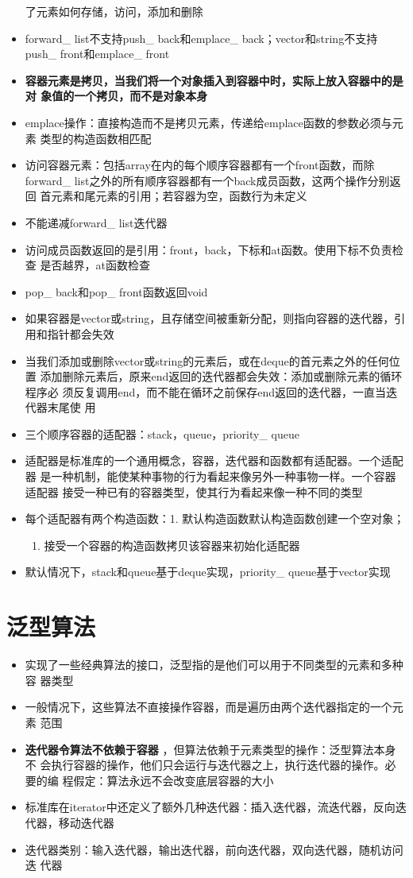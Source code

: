 \documentclass[11pt]{article}
\begin{document}
\begin{itemize}
了元素如何存储，访问，添加和删除
\item forward\_ list不支持push\_ back和emplace\_ back；vector和string不支持
push\_ front和emplace\_ front
\item \textbf{容器元素是拷贝，当我们将一个对象插入到容器中时，实际上放入容器中的是对
象值的一个拷贝，而不是对象本身}
\item emplace操作：直接构造而不是拷贝元素，传递给emplace函数的参数必须与元素
类型的构造函数相匹配
\item 访问容器元素：包括array在内的每个顺序容器都有一个front函数，而除
forward\_ list之外的所有顺序容器都有一个back成员函数，这两个操作分别返回
首元素和尾元素的引用；若容器为空，函数行为未定义
\item 不能递减forward\_ list迭代器
\item 访问成员函数返回的是引用：front，back，下标和at函数。使用下标不负责检查
是否越界，at函数检查
\item pop\_ back和pop\_ front函数返回void
\item 如果容器是vector或string，且存储空间被重新分配，则指向容器的迭代器，引
用和指针都会失效
\item 当我们添加或删除vector或string的元素后，或在deque的首元素之外的任何位置
添加删除元素后，原来end返回的迭代器都会失效：添加或删除元素的循环程序必
须反复调用end，而不能在循环之前保存end返回的迭代器，一直当迭代器末尾使
用
\item 三个顺序容器的适配器：stack，queue，priority\_ queue
\item 适配器是标准库的一个通用概念，容器，迭代器和函数都有适配器。一个适配器
是一种机制，能使某种事物的行为看起来像另外一种事物一样。一个容器适配器
接受一种已有的容器类型，使其行为看起来像一种不同的类型
\item 每个适配器有两个构造函数：1. 默认构造函数默认构造函数创建一个空对象；
\begin{enumerate}
\item 接受一个容器的构造函数拷贝该容器来初始化适配器
\end{enumerate}
\item 默认情况下，stack和queue基于deque实现，priority\_ queue基于vector实现
\end{itemize}
\section{泛型算法}
\label{sec-7}
\begin{itemize}
\item 实现了一些经典算法的接口，泛型指的是他们可以用于不同类型的元素和多种容
器类型
\item 一般情况下，这些算法不直接操作容器，而是遍历由两个迭代器指定的一个元素
范围
\item \textbf{迭代器令算法不依赖于容器} ，但算法依赖于元素类型的操作：泛型算法本身不
会执行容器的操作，他们只会运行与迭代器之上，执行迭代器的操作。必要的编
程假定：算法永远不会改变底层容器的大小
\item 标准库在iterator中还定义了额外几种迭代器：插入迭代器，流迭代器，反向迭
代器，移动迭代器
\item 迭代器类别：输入迭代器，输出迭代器，前向迭代器，双向迭代器，随机访问迭
代器
\end{itemize}
\end{document}
